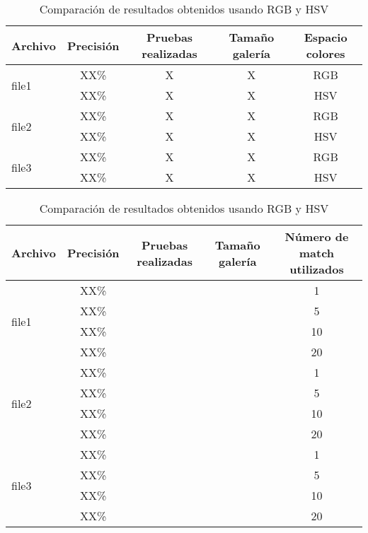 \documentclass[../memoria.tex]{subfiles}
\begin{document}
\label{Apendice}

\begin{table}
	\begin{center}
		\begin{tabular}{lcccc}
			Archivo		& Precisión  & Pruebas realizadas & Tamaño galería & Espacio colores  \\
			\hline
			\multirow{2}{6em}{file1}		& XX\% & X & X & RGB \\
						& XX\% & X & X & HSV \\
			\hline
			\multirow{2}{6em}{file2}		& XX\% & X & X & RGB \\
						& XX\% & X & X & HSV \\
			\hline
			\multirow{2}{6em}{file3}		& XX\% & X & X & RGB \\
						& XX\% & X & X & HSV \\
			\hline
		\end{tabular}  
	\end{center}
	\caption{Comparación de resultados obtenidos usando RGB y HSV }
\label{experimentos RGB y HSV}
\end{table}

\begin{table}
	\begin{center}
		\begin{tabular}{lcccc}
			Archivo		& Precisión  & Pruebas realizadas & Tamaño galería & Número de match utilizados  \\
			\hline
			\multirow{4}{6em}{file1}		& XX\%  & & & 1 \\
						& XX\% & & & 5 \\
						& XX\% & & & 10 \\
						& XX\% & & & 20 \\
			\hline
			\multirow{4}{6em}{file2}		& XX\% & & & 1 \\
						& XX\% & & & 5 \\
						& XX\% & & & 10 \\
						& XX\% & & & 20 \\
			\hline
			\multirow{4}{6em}{file3}		& XX\% & & & 1 \\
						& XX\% & & & 5 \\
						& XX\% & & & 10 \\
						& XX\% & & & 20 \\
			\hline
		\end{tabular}  
	\end{center}
	\caption{Comparación de resultados obtenidos usando RGB y HSV }
\label{experimentos RGB y HSV}
\end{table}
\end{document}
